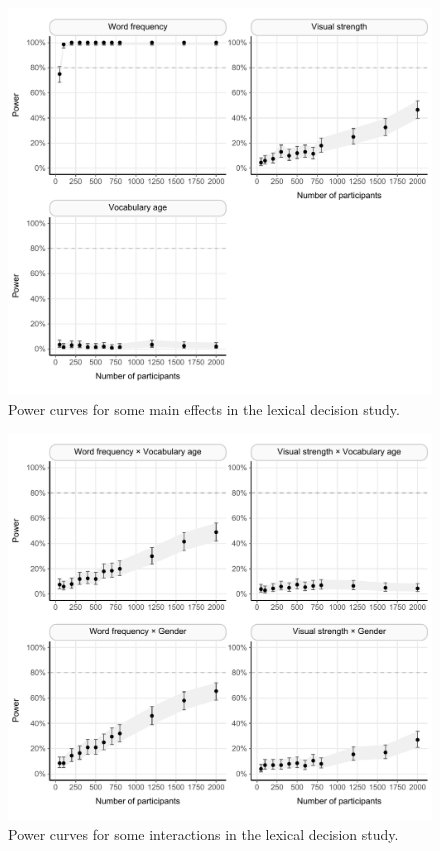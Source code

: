 \documentclass[
  12pt,
  man,floatsintext]{apa7}
\begin{document}
\begin{figure}

{\centering \includegraphics[width=1\linewidth]{../lexicaldecision/power_analysis/plots/lexicaldecision_powercurve_plots_1_2_3} 

}

\caption{Power curves for some main effects in the lexical decision study.}\label{fig:lexicaldecision-powercurve-plots-1-2-3}
\end{figure}

\begin{figure}

{\centering \includegraphics[width=1\linewidth]{../lexicaldecision/power_analysis/plots/lexicaldecision_powercurve_plots_4_5_6_7} 

}

\caption{Power curves for some interactions in the lexical decision study.}\label{fig:lexicaldecision-powercurve-plots-4-5-6-7}
\end{figure}
\end{document}
